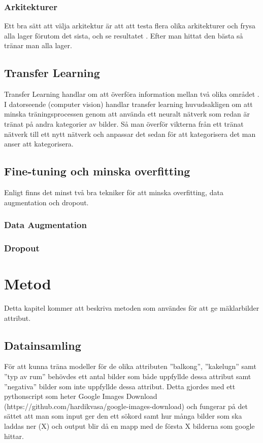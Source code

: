\documentclass{kththesis}
\begin{document}
  

    \subsection{Arkitekturer}
    Ett bra sätt att välja arkitektur är att att testa flera olika arkitekturer och frysa alla lager förutom det sista, och se resultatet \parencite{Goodfellow-et-al-2016}. Efter man hittat den bästa så tränar man alla lager.

  \section{Transfer Learning}
  Transfer Learning handlar om att överföra information mellan två olika området \parencite{oquab_learning_2014}. I datorseende (computer vision) handlar transfer learning huvudsakligen om att minska träningsprocessen genom att använda ett neuralt nätverk som redan är tränat på andra kategorier av bilder. Så man överför vikterna från ett tränat nätverk till ett nytt nätverk och anpassar det sedan för att kategorisera det man anser att kategorisera.

  \section{Fine-tuning och minska overfitting}
  Enligt \cite{krizhevsky_imagenet_2012} finns det minst två bra tekniker för att minska overfitting, data augmentation och dropout.

    \subsection{Data Augmentation}

    \subsection{Dropout}

\chapter{Metod}
Detta kapitel kommer att beskriva metoden som användes för att ge mäklarbilder attribut.


\section{Datainsamling}
För att kunna träna modeller för de olika attributen ”balkong”, ”kakelugn” samt ”typ av rum” behövdes ett antal bilder som både uppfyllde dessa attribut samt ”negativa” bilder som inte uppfyllde dessa attribut.
Detta gjordes med ett pythonscript som heter Google Images Download (https://github.com/hardikvasa/google-images-download) och fungerar på det sättet att man som input ger den ett sökord samt hur många bilder som ska laddas ner (X) och output blir då en mapp med de första X bilderna som google hittar. 
\end{document}
